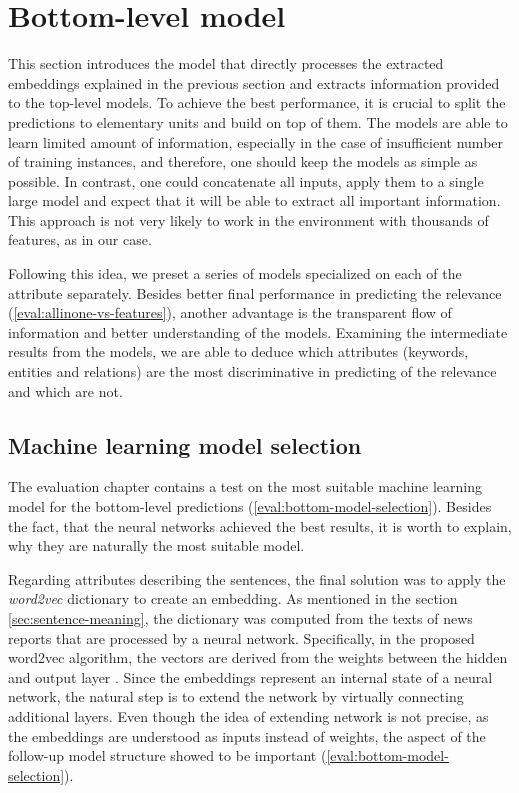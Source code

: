 \documentclass[
  digital, %
  table,   %
  lof,     %
  lot,     %
]{fithesis3}
\begin{document}
\section{Bottom-level model}
\label{sec:bottom-level-models}
This section introduces the model that directly processes the extracted embeddings explained in the previous section and extracts information provided to the top-level models.
To achieve the best performance, it is crucial to split the predictions to elementary units and build on top of them.
The models are able to learn limited amount of information, especially in the case of insufficient number of training instances, and therefore, one should keep the models as simple as possible.
In contrast, one could concatenate all inputs, apply them to a single large model and expect that it will be able to extract all important information.
This approach is not very likely to work in the environment with thousands of features, as in our case.

Following this idea, we preset a series of models specialized on each of the attribute separately.
Besides better final performance in predicting the relevance (\ref{eval:allinone-vs-features}), another advantage is the transparent flow of information and better understanding of the models.
Examining the intermediate results from the models, we are able to deduce which attributes (keywords, entities and relations) are the most discriminative in predicting of the relevance and which are not.

\subsection{Machine learning model selection}
The evaluation chapter contains a test on the most suitable machine learning model for the bottom-level predictions (\ref{eval:bottom-model-selection}).
Besides the fact, that the neural networks achieved the best results, it is worth to explain, why they are naturally the most suitable model.

Regarding attributes describing the sentences, the final solution was to apply the \textit{word2vec} dictionary to create an embedding.
As mentioned in the section \ref{sec:sentence-meaning}, the dictionary was computed from the texts of news reports that are processed by a neural network.
Specifically, in the proposed word2vec algorithm, the vectors are derived from the weights between the hidden and output layer \cite[sec. 2.2.1]{wordEmbeddings}.
Since the embeddings represent an internal state of a neural network, the natural step is to extend the network by virtually connecting additional layers.
Even though the idea of extending network is not precise, as the embeddings are understood as inputs instead of weights, the aspect of the follow-up model structure showed to be important (\ref{eval:bottom-model-selection}).
\end{document}
